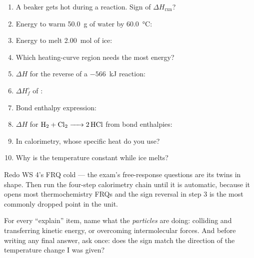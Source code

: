 \documentclass{apchem-worksheet}
\begin{document}
\begin{enumerate}[leftmargin=*,itemsep=0.4em]
  \item A beaker gets hot during a reaction. Sign of $\Delta H_{\text{rxn}}$?
  \item Energy to warm \SI{50.0}{\gram} of water by \SI{60.0}{\celsius}:
  \item Energy to melt \SI{2.00}{\mole} of ice:
  \item Which heating-curve region needs the most energy?
  \item $\Delta H$ for the reverse of a $-566$~kJ reaction:
  \item $\Delta H_f^\circ$ of : 
  \item Bond enthalpy expression: 
  \item $\Delta H$ for $\ce{H2 + Cl2 -> 2HCl}$ from bond enthalpies:
  \item In calorimetry, whose specific heat do you use?
  \item Why is the temperature constant while ice melts?
\end{enumerate}

\begin{apcnote}
Redo WS 4's FRQ cold --- the exam's free-response questions are its twins
in shape. Then run the four-step calorimetry chain until it is automatic,
because it opens most thermochemistry FRQs and the sign reversal in step 3
is the most commonly dropped point in the unit.

For every ``explain'' item, name what the \emph{particles} are doing:
colliding and transferring kinetic energy, or overcoming intermolecular
forces. And before writing any final answer, ask once: does the sign match
the direction of the temperature change I was given?
\end{apcnote}
\end{document}
